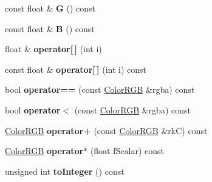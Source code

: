 \begin{DoxyCompactItemize}
\item 
const float \& {\bfseries G} () const \hypertarget{class_magnum_1_1_color_r_g_b_ab7dd69c2683beece69f853176195e6e0}{}\label{class_magnum_1_1_color_r_g_b_ab7dd69c2683beece69f853176195e6e0}

\item 
const float \& {\bfseries B} () const \hypertarget{class_magnum_1_1_color_r_g_b_a6f52a4c14582b1e828c2ab95e3695702}{}\label{class_magnum_1_1_color_r_g_b_a6f52a4c14582b1e828c2ab95e3695702}

\item 
float \& {\bfseries operator\mbox{[}$\,$\mbox{]}} (int i)\hypertarget{class_magnum_1_1_color_r_g_b_a5e9b1fb71e2e03c9ea5864028cfcc53f}{}\label{class_magnum_1_1_color_r_g_b_a5e9b1fb71e2e03c9ea5864028cfcc53f}

\item 
const float \& {\bfseries operator\mbox{[}$\,$\mbox{]}} (int i) const \hypertarget{class_magnum_1_1_color_r_g_b_a90f425933912c8bcfefaef98ebc9b886}{}\label{class_magnum_1_1_color_r_g_b_a90f425933912c8bcfefaef98ebc9b886}

\item 
bool {\bfseries operator==} (const \hyperlink{class_magnum_1_1_color_r_g_b}{Color\+R\+GB} \&rgba) const \hypertarget{class_magnum_1_1_color_r_g_b_a96fe3b83d593664b8260ea17ee8b07af}{}\label{class_magnum_1_1_color_r_g_b_a96fe3b83d593664b8260ea17ee8b07af}

\item 
bool {\bfseries operator$<$} (const \hyperlink{class_magnum_1_1_color_r_g_b}{Color\+R\+GB} \&rgba) const \hypertarget{class_magnum_1_1_color_r_g_b_aeb2ccac52122c8efdf5e75abbe26c389}{}\label{class_magnum_1_1_color_r_g_b_aeb2ccac52122c8efdf5e75abbe26c389}

\item 
\hyperlink{class_magnum_1_1_color_r_g_b}{Color\+R\+GB} {\bfseries operator+} (const \hyperlink{class_magnum_1_1_color_r_g_b}{Color\+R\+GB} \&rkC) const \hypertarget{class_magnum_1_1_color_r_g_b_a743299844754fc35a8b00842f4d8ccb6}{}\label{class_magnum_1_1_color_r_g_b_a743299844754fc35a8b00842f4d8ccb6}

\item 
\hyperlink{class_magnum_1_1_color_r_g_b}{Color\+R\+GB} {\bfseries operator$\ast$} (float f\+Scalar) const \hypertarget{class_magnum_1_1_color_r_g_b_aabacb62f747b6daa7e3b35dcd3ac0360}{}\label{class_magnum_1_1_color_r_g_b_aabacb62f747b6daa7e3b35dcd3ac0360}

\item 
unsigned int {\bfseries to\+Integer} () const \hypertarget{class_magnum_1_1_color_r_g_b_a7c54f1285cc5a1a58f0d5e1f9b4065fa}{}\label{class_magnum_1_1_color_r_g_b_a7c54f1285cc5a1a58f0d5e1f9b4065fa}


\end{DoxyCompactItemize}
